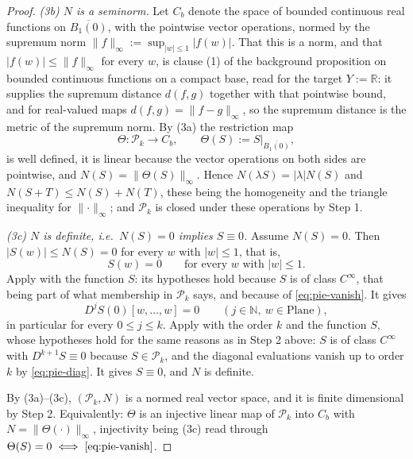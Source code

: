 \begin{proof}
\emph{(3b) $N$ is a seminorm.}  Let $C_b$ denote the space of bounded continuous real functions
on $\overline{B_1(0)}$, with the pointwise vector operations, normed by the supremum norm
$\lVert f\rVert_\infty:=\sup_{\lvert w\rvert\le1}\lvert f(w)\rvert$.  That this is a norm, and
that $\lvert f(w)\rvert\le\lVert f\rVert_\infty$ for every $w$, is clause (1) of the background
proposition on bounded continuous functions on a compact base, read for the target
$Y:=\mathbb{R}$: it supplies the supremum distance $d(f,g)$ together with that pointwise bound,
and for real-valued maps $d(f,g)=\lVert f-g\rVert_\infty$, so the supremum distance is the
metric of the supremum norm.  By (3a) the restriction map
\[
  \Theta\colon\mathcal{P}_k\to C_b,\qquad \Theta(S):=\left.S\right|_{\overline{B_1(0)}},
\]
is well defined, it is linear because the vector operations on both sides are pointwise, and
$N(S)=\lVert\Theta(S)\rVert_\infty$.  Hence
$N(\lambda S)=\lvert\lambda\rvert N(S)$ and $N(S+T)\le N(S)+N(T)$, these being the homogeneity
and the triangle inequality for $\lVert\cdot\rVert_\infty$; and $\mathcal{P}_k$ is closed under
these operations by Step 1.

\emph{(3c) $N$ is definite, i.e.\ $N(S)=0$ implies $S\equiv0$.}
Assume $N(S)=0$.  Then $\lvert S(w)\rvert\le N(S)=0$ for every $w$ with $\lvert w\rvert\le1$,
that is,
\begin{equation}\label{eq:pie-vanish}
  S(w)=0\qquad\text{for every }w\text{ with }\lvert w\rvert\le1 .
\end{equation}
Apply  with the function $S$: its hypotheses hold because
$S$ is of class $C^{\infty}$, that being part of what membership in $\mathcal{P}_k$ says, and
because of \eqref{eq:pie-vanish}.  It gives
\begin{equation}\label{eq:pie-diag}
  D^{j}S(0)[w,\ldots,w]=0\qquad(j\in\mathbb{N},\ w\in\mathrm{Plane}),
\end{equation}
in particular for every $0\le j\le k$.  Apply  with the order
$k$ and the function $S$, whose hypotheses hold for the same reasons as in Step 2 above: $S$ is
of class $C^{\infty}$ with $D^{k+1}S\equiv0$ because $S\in\mathcal{P}_k$, and the diagonal
evaluations vanish up to order $k$ by \eqref{eq:pie-diag}.  It gives $S\equiv0$, and $N$ is
definite.

By (3a)--(3c), $(\mathcal{P}_k,N)$ is a normed real vector space, and it is finite
dimensional by Step 2.  Equivalently: $\Theta$ is an injective linear map of $\mathcal{P}_k$
into $C_b$ with $N=\lVert\Theta(\cdot)\rVert_\infty$, injectivity being (3c) read through
$\Theta(S)=0\iff\eqref{eq:pie-vanish}$.


\end{proof}
